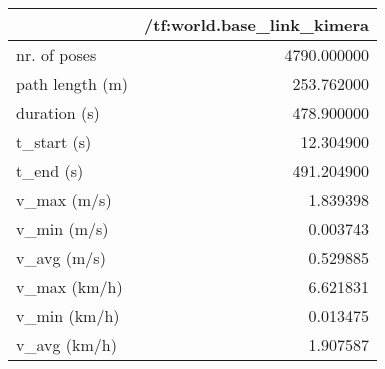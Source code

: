 \begin{tabular}{lr}
\toprule
{} &  /tf:world.base\_link\_kimera \\
\midrule
nr. of poses    &                 4790.000000 \\
path length (m) &                  253.762000 \\
duration (s)    &                  478.900000 \\
t\_start (s)     &                   12.304900 \\
t\_end (s)       &                  491.204900 \\
v\_max (m/s)     &                    1.839398 \\
v\_min (m/s)     &                    0.003743 \\
v\_avg (m/s)     &                    0.529885 \\
v\_max (km/h)    &                    6.621831 \\
v\_min (km/h)    &                    0.013475 \\
v\_avg (km/h)    &                    1.907587 \\
\bottomrule
\end{tabular}
